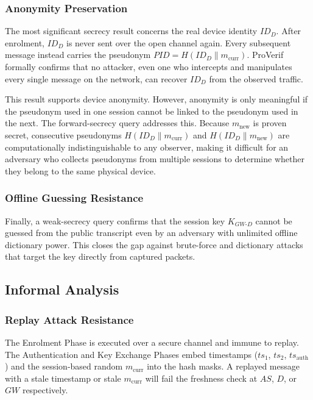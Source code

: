 \documentclass[conference]{IEEEtran}
\begin{document}
\subsubsection{Anonymity Preservation}

The most significant secrecy result concerns the real device identity $ID_D$.
After enrolment, $ID_D$ is never sent over the open channel again.  Every
subsequent message instead carries the pseudonym
$\mathit{PID} = H(ID_D \| m_{\mathrm{curr}})$.
ProVerif formally confirms that no attacker, even one who intercepts and manipulates every single
message on the network, can recover $ID_D$ from the observed traffic.

This result supports device anonymity.  However, anonymity is only meaningful
if the pseudonym used in one session cannot be linked to the pseudonym used in
the next.  The forward-secrecy query addresses this.  Because
$m_{\mathrm{new}}$ is proven secret, consecutive pseudonyms
$H(ID_D \| m_{\mathrm{curr}})$ and $H(ID_D \| m_{\mathrm{new}})$ are
computationally indistinguishable to any observer, making it difficult for an
adversary who collects pseudonyms from multiple sessions to determine whether
they belong to the same physical device.

\subsubsection{Offline Guessing Resistance}

Finally, a weak-secrecy query confirms that the session key $K_{GW\text{-}D}$
cannot be guessed from the public transcript even by an adversary with
unlimited offline dictionary power.  This closes the gap against brute-force
and dictionary attacks that target the key directly from captured packets.

\subsection{Informal Analysis}

\subsubsection{Replay Attack Resistance}
The Enrolment Phase is executed over a secure channel and immune to replay.
The Authentication and Key Exchange Phases embed timestamps
($ts_1$, $ts_2$, $ts_{\mathrm{auth}}$) and the session-based random
$m_{\mathrm{curr}}$ into the hash masks.  A replayed message with a stale
timestamp or stale $m_{\mathrm{curr}}$ will fail the freshness check at
$AS$, $D$, or $GW$ respectively.
\end{document}
